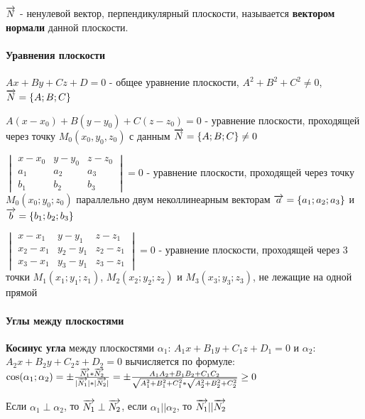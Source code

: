 \documentclass{article}
\def\vec{\ensuremath\overrightarrow}
\begin{document}
\begin{flushleft}

$\vec{N}$ - ненулевой вектор, перпендикулярный плоскости, называется \textbf{вектором нормали} данной плоскости.

\paragraph{Уравнения плоскости}

$Ax + By + C z + D = 0$ - общее уравнение плоскости, $A^2 + B^2 + C^2 \ne 0$, $\vec{N} = \{ A; B; C \}$

$A(x - x_0) + B(y - y_0) + C(z - z_0) = 0$ - уравнение плоскости, проходящей через точку $M_0(x_0, y_0, z_0)$ с данным $\vec{N} = \{ A; B; C \} \ne 0$ 


$\begin{vmatrix}
    x - x_0 & y - y_0 & z - z_0 \\
    a_1 & a_2 & a_3 \\
    b_1 & b_2 & b_3
\end{vmatrix} = 0$ - 
уравнение плоскости, проходящей через точку $M_0(x_0; y_0; z_0)$ параллельно двум неколлинеарным векторам $\vec{a} = \{ a_1; a_2; a_3 \}$ и $\vec{b} = \{ b_1; b_2; b_3 \}$

$\begin{vmatrix}
    x - x_1 & y - y_1 & z - z_1 \\
    x_2 - x_1 & y_2 - y_1 & z_2 - z_1 \\
    x_3 - x_1 & y_3 - y_1 & z_3 - z_1
\end{vmatrix} = 0$ - уравнение плоскости, проходящей через 3 точки $M_1(x_1; y_1; z_1)$, $M_2(x_2; y_2; z_2)$ и $M_3(x_3; y_3; z_3)$, не лежащие на одной прямой

\paragraph{Углы между плоскостями}

\textbf{Косинус угла} между плоскостями $\alpha_1$: $A_1 x + B_1 y + C_1 z + D_1 = 0$ и $\alpha_2$: $A_2 x + B_2 y + C_2 z + D_2 = 0$ вычисляется по формуле: $\cos (\alpha_1; \alpha_2) = \pm \frac{\vec{N_1} * \vec{N_2}}{|\vec{N_1}| * |\vec{N_2}|} = \pm \frac{A_1 A_2 + B_1 B_2 + C_1 C_2}{\sqrt{A_1^2 + B_1^2 + C_1^2} * \sqrt{A_2^2 + B_2^2 + C_2^2}} \ge 0$

Если $\alpha_1 \perp \alpha_2$, то $\vec{N_1} \perp \vec{N_2}$, если $\alpha_1 || \alpha_2$, то $\vec{N_1} || \vec{N_2}$


\end{flushleft}
\end{document}
